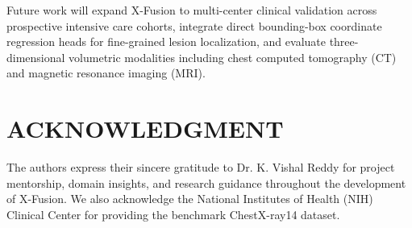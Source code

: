 \documentclass[conference]{IEEEtran}
\begin{document}
Future work will expand X-Fusion to multi-center clinical validation across prospective intensive care cohorts, integrate direct bounding-box coordinate regression heads for fine-grained lesion localization, and evaluate three-dimensional volumetric modalities including chest computed tomography (CT) and magnetic resonance imaging (MRI).

\balance
\section*{ACKNOWLEDGMENT}
The authors express their sincere gratitude to Dr. K. Vishal Reddy for project mentorship, domain insights, and research guidance throughout the development of X-Fusion. We also acknowledge the National Institutes of Health (NIH) Clinical Center for providing the benchmark ChestX-ray14 dataset.
\end{document}
